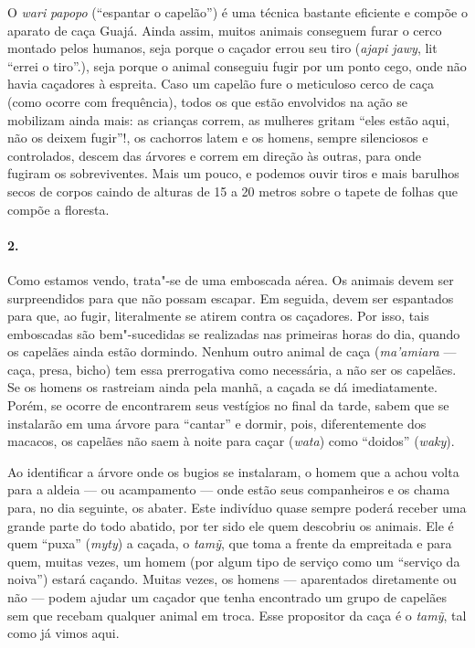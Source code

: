 O \emph{wari} \emph{papopo} (``espantar o capelão'') é uma técnica
bastante eficiente e compõe o aparato de caça Guajá. Ainda assim, muitos
animais conseguem furar o cerco montado pelos humanos, seja porque o
caçador errou seu tiro (\emph{ajapi jawy}, lit ``errei o tiro''.), seja
porque o animal conseguiu fugir por um ponto cego, onde não havia
caçadores à espreita. Caso um capelão fure o meticuloso cerco de caça
(como ocorre com frequência), todos os que estão envolvidos na ação se
mobilizam ainda mais: as crianças correm, as mulheres gritam ``eles estão
aqui, não os deixem fugir''!, os cachorros latem e os homens, sempre
silenciosos e controlados, descem das árvores e correm em direção às
outras, para onde fugiram os sobreviventes. Mais um pouco, e podemos
ouvir tiros e mais barulhos secos de corpos caindo de alturas de 15 a 20
metros sobre o tapete de folhas que compõe a floresta.

\paragraph{2.}

Como estamos vendo, trata"-se de uma emboscada aérea. Os animais devem
ser surpreendidos para que não possam escapar. Em seguida, devem ser
espantados para que, ao fugir, literalmente se atirem contra os
caçadores. Por isso, tais emboscadas são bem"-sucedidas se realizadas nas
primeiras horas do dia, quando os capelães ainda estão dormindo. Nenhum
outro animal de caça (\emph{ma'amiara} --- caça, presa, bicho) tem essa
prerrogativa como necessária, a não ser os capelães. Se os homens os
rastreiam ainda pela manhã, a caçada se dá imediatamente. Porém, se
ocorre de encontrarem seus vestígios no final da tarde, sabem que se
instalarão em uma árvore para ``cantar'' e dormir, pois, diferentemente
dos macacos, os capelães não saem à noite para caçar (\emph{wata}) como
``doidos'' (\emph{waky}).

Ao identificar a árvore onde os bugios se instalaram, o homem que a
achou volta para a aldeia --- ou acampamento --- onde estão seus
companheiros e os chama para, no dia seguinte, os abater. Este indivíduo
quase sempre poderá receber uma grande parte do todo abatido, por ter
sido ele quem descobriu os animais. Ele é quem ``puxa'' (\emph{myty}) a
caçada, o \emph{tamỹ}, que toma a frente da empreitada e para quem,
muitas vezes, um homem (por algum tipo de serviço como um ``serviço da
noiva'') estará caçando. Muitas vezes, os homens --- aparentados
diretamente ou não --- podem ajudar um caçador que tenha encontrado um
grupo de capelães sem que recebam qualquer animal em troca. Esse
propositor da caça é o \emph{tamỹ}, tal como já vimos aqui.

